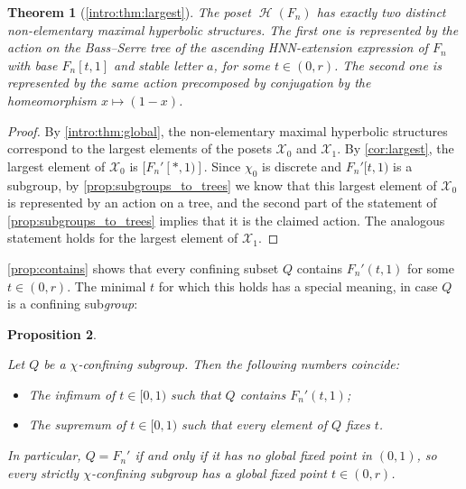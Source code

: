 \documentclass[reqno,12pt]{amsart}\setcounter{tocdepth}{1}
\newtheorem{theorem}{Theorem}[section]
\newtheorem{proposition}[theorem]{Proposition}
\theoremstyle{definition}
\DeclareMathOperator{\Hyp}{\mathcal{H}}
\newcommand{\X}{\mathcal{X}}
\numberwithin{equation}{section}
\begin{document}
\begin{theorem}[\cref{intro:thm:largest}]\label{thm:largest:geom}
The poset $\Hyp(F_n)$ has exactly two distinct non-elementary maximal hyperbolic structures. The first one is represented by the action on the Bass--Serre tree of the ascending HNN-extension expression of $F_n$ with base $F_n[t, 1]$ and stable letter $a$, for some $t \in (0, r)$. The second one is represented by the same action precomposed by conjugation by the homeomorphism $x \mapsto (1 - x)$.
\end{theorem}

\begin{proof}
By \cref{intro:thm:global}, the non-elementary maximal hyperbolic structures correspond to the largest elements of the posets $\X_0$ and $\X_1$. By \cref{cor:largest}, the largest element of $\X_0$ is $[F_n'[*,1)]$. Since $\chi_0$ is discrete and $F_n'[t,1)$ is a subgroup, by \cref{prop:subgroups_to_trees} we know that this largest element of $\X_0$ is represented by an action on a tree, and the second part of the statement of \cref{prop:subgroups_to_trees} implies that it is the claimed action. The analogous statement holds for the largest element of $\X_1$.
\end{proof}

\medskip

\cref{prop:contains} shows that every confining subset $Q$ contains $F_n'(t, 1)$ for some $t \in (0, r)$. The minimal $t$ for which this holds has a special meaning, in case $Q$ is a confining sub\emph{group}:

\begin{proposition}
\label{prop:contains:subgroup}

Let $Q$ be a $\chi$-confining subgroup. Then the following numbers coincide:
\begin{itemize}
\item The infimum of $t \in [0, 1)$ such that $Q$ contains $F_n'(t, 1)$;
\item The supremum of $t \in [0, 1)$ such that every element of $Q$ fixes $t$.
\end{itemize}
In particular, $Q = F_n'$ if and only if it has no global fixed point in $(0, 1)$, so every strictly $\chi$-confining subgroup has a global fixed point $t\in (0,r)$.
\end{proposition}
\end{document}
